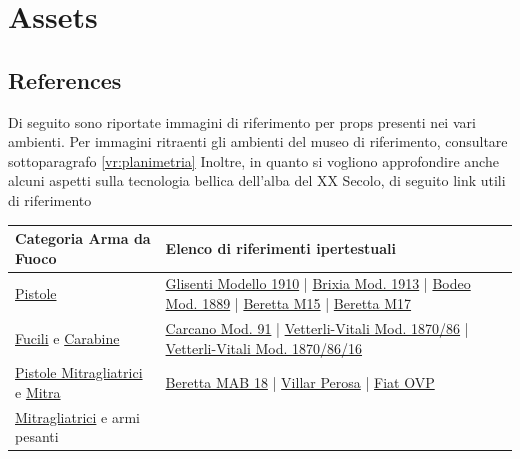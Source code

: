 \documentclass[10pt, openany]{article}
\begin{document}
  \section{Assets}
  \subsection{References}
  Di seguito sono riportate immagini di riferimento per props presenti nei vari ambienti. Per immagini ritraenti gli ambienti del museo di riferimento, consultare 
  sottoparagrafo \ref{vr:planimetria}
  \FloatBarrier
  Inoltre, in quanto si vogliono approfondire anche alcuni aspetti sulla tecnologia bellica dell'alba del XX Secolo, di seguito link utili di riferimento
  \renewcommand{\arraystretch}{1.5} %
  \begin{table}[h]\label{vr:weapons}
    \centering
    \begin{tabular}{@{} p{} p{} @{}}
      \toprule
      \textbf{Categoria Arma da Fuoco} & \textbf{Elenco di riferimenti ipertestuali} \\
      \midrule
      \href{https://it.wikipedia.org/wiki/Pistola}{Pistole} 
        & \href{https://it.wikipedia.org/wiki/Glisenti_Modello_1910}{Glisenti Modello 1910} | \href{https://it.wikipedia.org/wiki/Brixia_Mod._1913}{Brixia Mod. 1913} | 
          \href{https://it.wikipedia.org/wiki/Bodeo_Mod._1889}{Bodeo Mod. 1889} | \href{https://it.wikipedia.org/wiki/Beretta_M15}{Beretta M15} | 
          \href{https://it.wikipedia.org/wiki/Beretta_M17}{Beretta M17} \\
      \href{https://it.wikipedia.org/wiki/Fucile}{Fucili} e \href{https://it.wikipedia.org/wiki/Carabina}{Carabine} 
        & \href{https://it.wikipedia.org/wiki/Carcano_Mod._91}{Carcano Mod. 91} | \href{https://it.wikipedia.org/wiki/Vetterli-Vitali_Mod._1870/87}{Vetterli-Vitali Mod. 1870/86} |
          \href{https://it.wikipedia.org/wiki/Vetterli-Vitali_Mod._1870/87/16}{Vetterli-Vitali Mod. 1870/86/16} \\
      \href{https://it.wikipedia.org/wiki/Pistola_mitragliatrice}{Pistole Mitragliatrici} e \href{https://it.wikipedia.org/wiki/Mitra_(arma)}{Mitra}
        & \href{https://it.wikipedia.org/wiki/Beretta_MAB_18}{Beretta MAB 18} | \href{https://it.wikipedia.org/wiki/Villar_Perosa_(arma)}{Villar Perosa} | 
          \href{https://it.wikipedia.org/wiki/OVP}{Fiat OVP} \\
      \href{https://it.wikipedia.org/wiki/Mitragliatrice}{Mitragliatrici} e armi pesanti 

\end{tabular}
\end{table}
\end{document}
